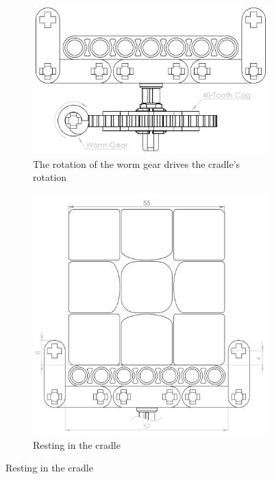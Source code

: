 \documentclass{report}
\begin{document}
	\begin{figure}[h!]
		\centering
		\begin{subfigure}[b]{0.25\linewidth}
			\includegraphics[width=\linewidth]{Resources/Images/dwgCradleWormGear.png}
			\caption{The rotation of the worm gear drives the cradle's rotation}
			\label{fig:dwgCradleWormGear}
		\end{subfigure}
		\begin{subfigure}[b]{0.25\linewidth}
			\includegraphics[width=\linewidth]{Resources/Images/dwgCradleCurvedEdgeNormal.png}
			\caption{Resting in the cradle}

\end{subfigure}
\end{figure}
\end{document}
